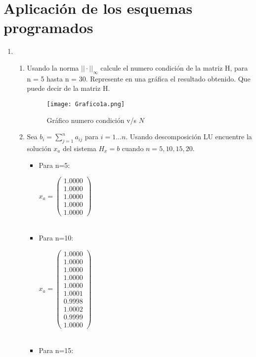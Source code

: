 \documentclass{udpreport}
\begin{document}
 \section{Aplicación de los esquemas programados}
 \begin{enumerate}
 	\item   
 		\begin{enumerate}
 			\item 	Usando la norma $|| · ||_{\infty}$ calcule el numero condición de la matriz H, para n = 5 hasta n = 30.
Represente en una gráfica el resultado obtenido. Que puede decir de la matriz H.
\begin{figure}[H]
 				\centering
 				\texttt{[image: Grafico1a.png]}
 				\caption{Gráfico numero condición v/s $N$ }	
 			\end{figure}
 			
 			\item Sea $b_{i} = \sum_{j=1}^n a_{ij}$ para $i = 1...n$. Usando descomposición LU encuentre la solución $x_{a}$ del
sistema $H_{x} = b$ cuando $n = 5, 10, 15, 20$.
 				\begin{itemize} 				
 				\item Para n=5:
 				
 				$x_{a} = \left(\begin{array}{c} 1.0000\\ 1.0000\\ 1.0000\\ 1.0000\\ 1.0000\end{array}\right)$
 				\\
 				\\
 				\item Para n=10:
 				
 				$x_{a} = \left(\begin{array}{c} 1.0000\\ 1.0000\\1.0000\\1.0000\\ 1.0000\\ 1.0001\\ 0.9998\\ 1.0002\\ 0.9999\\1.0000 \end{array}\right)$
 				\\
 				\\
 				\item Para n=15:
 				

\end{itemize}
\end{enumerate}
\end{enumerate}
\end{document}
